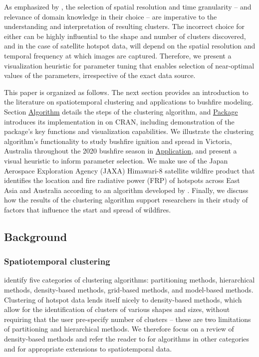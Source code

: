 As emphasized by \citet{kisilevich2009spatio}, the selection of spatial
resolution and time granularity -- and relevance of domain knowledge in
their choice -- are imperative to the understanding and interpretation
of resulting clusters. The incorrect choice for either can be highly
influential to the shape and number of clusters discovered, and in the
case of satellite hotspot data, will depend on the spatial resolution
and temporal frequency at which images are captured. Therefore, we
present a visualization heuristic for parameter tuning that enables
selection of near-optimal values of the parameters, irrespective of the
exact data source.

This paper is organized as follows. The next section provides an
introduction to the literature on spatiotemporal clustering and
applications to bushfire modeling. Section
\protect\hyperlink{algorithm}{Algorithm} details the steps of the
clustering algorithm, and \protect\hyperlink{package}{Package}
introduces its implementation in  on CRAN, including
demonstration of the package's key functions and visualization
capabilities. We illustrate the clustering algorithm's functionality to
study bushfire ignition and spread in Victoria, Australia throughout the
2020 bushfire season in \protect\hyperlink{application}{Application},
and present a visual heuristic to inform parameter selection. We make
use of the Japan Aerospace Exploration Agency (JAXA) Himawari-8
satellite wildfire product \citep{jaxa} that identifies the location and
fire radiative power (FRP) of hotspots across East Asia and Australia
according to an algorithm developed by \citet{Kurihara2020}. Finally, we
discuss how the results of the clustering algorithm support researchers
in their study of factors that influence the start and spread of
wildfires.

\hypertarget{background}{%
\subsection{Background}\label{background}}

\hypertarget{spatiotemporal-clustering}{%
\subsubsection{Spatiotemporal
clustering}\label{spatiotemporal-clustering}}

\citet{datamining2012} identify five categories of clustering
algorithms: partitioning methods, hierarchical methods, density-based
methods, grid-based methods, and model-based methods. Clustering of
hotspot data lends itself nicely to density-based methods, which allow
for the identification of clusters of various shapes and sizes, without
requiring that the user pre-specify number of clusters -- these are two
limitations of partitioning and hierarchical methods. We therefore focus
on a review of density-based methods and refer the reader to
\citet{datamining2012} for algorithms in other categories and
\citet{kisilevich2009spatio} for appropriate extensions to
spatiotemporal data.

